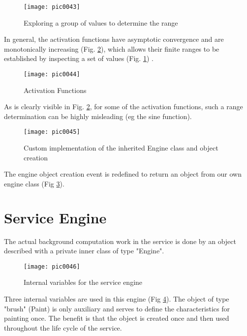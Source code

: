\begin{figure}[h]
\centering
\texttt{[image: pic0043]}
\caption{Exploring a group of values to determine the range}
\label{fig:pic0043}
\end{figure}
\FloatBarrier

In general, the activation functions have asymptotic convergence and are monotonically increasing (Fig. \ref{fig:pic0044}), which allows their finite ranges to be established by inspecting a set of values (Fig. \ref{fig:pic0043}) .

\begin{figure}[h]
\centering
\texttt{[image: pic0044]}
\caption{Activation Functions \cite{afwiki}}
\label{fig:pic0044}
\end{figure}
\FloatBarrier

As is clearly visible in Fig. \ref{fig:pic0044}, for some of the activation functions, such a range determination can be highly misleading (eg the sine function).

\begin{figure}[h]
\centering
\texttt{[image: pic0045]}
\caption{Custom implementation of the inherited Engine class and object creation}
\label{fig:pic0045}
\end{figure}
\FloatBarrier

The engine object creation event is redefined to return an object from our own engine class (Fig \ref{fig:pic0045}).

\section{Service Engine}

The actual background computation work in the service is done by an object described with a private inner class of type "Engine".

\begin{figure}[h]
\centering
\texttt{[image: pic0046]}
\caption{Internal variables for the service engine}
\label{fig:pic0046}
\end{figure}
\FloatBarrier

Three internal variables are used in this engine (Fig \ref{fig:pic0046}). The object of type "brush" (Paint) is only auxiliary and serves to define the characteristics for painting once. The benefit is that the object is created once and then used throughout the life cycle of the service.

